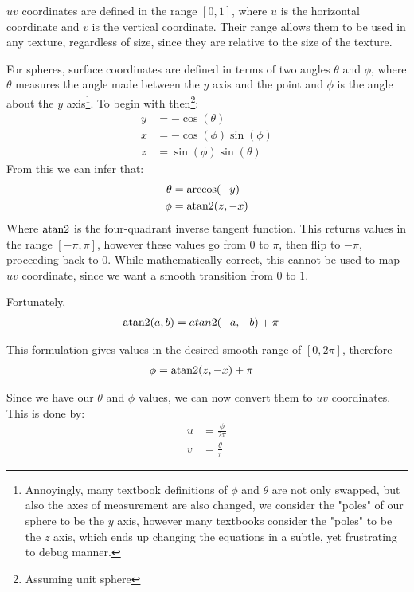 \documentclass[main.tex]{subfiles}
\begin{document}
$uv$ coordinates are defined in the range $[0, 1]$, where $u$ is the horizontal coordinate and $v$ is the vertical coordinate. Their range allows them to be used
in any texture, regardless of size, since they are relative to the size of the texture.

For spheres, surface coordinates are defined in terms of two angles $\theta$ and $\phi$, where $\theta$ measures the angle made between the $y$ axis and the point
and $\phi$ is the angle about the $y$ axis\footnote{Annoyingly, many textbook definitions of $\phi$ and $\theta$ are not only swapped, but also the axes of measurement 
are also changed, we consider the "poles" of our sphere to be the $y$ axis, however many textbooks consider the "poles" to be the $z$ axis, which ends up changing the equations in 
a subtle, yet frustrating to debug manner.}.
To begin with then\footnote{Assuming unit sphere}:
\begin{align*}
    y &= -\cos(\theta)\\
    x &= -\cos(\phi)\sin(\phi)\\
    z &= \sin(\phi)\sin(\theta)
\end{align*}
From this we can infer that:
\begin{align*}
    \theta &= \arccos(-y)\\
    \phi &= \operatorname{atan2}(z, -x)
\end{align*}
Where $\operatorname{atan2}$ is the four-quadrant inverse tangent function. This returns values in the range $[-\pi, \pi]$, however these values go from
$0$ to $\pi$, then flip to $-\pi$, proceeding back to $0$. While mathematically correct, this cannot be used to map $uv$ coordinate, since we want a smooth 
transition from $0$ to $1$.

Fortunately,
\begin{align*}
    \operatorname{atan2}(a, b) &= atan2(-a, -b) + \pi
\end{align*}

This formulation gives values in the desired smooth range of $[0, 2\pi]$, therefore
\begin{align*}
    \phi &= \operatorname{atan2}(z, -x) + \pi
\end{align*}

Since we have our $\theta$ and $\phi$ values, we can now convert them to $uv$ coordinates. This is done by:
\begin{align*}
    u &= \frac{\phi}{2\pi}\\
    v &= \frac{\theta}{\pi}
\end{align*}
\end{document}
